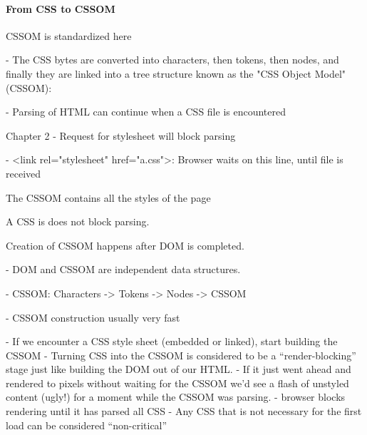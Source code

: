 \paragraph{From CSS to CSSOM}



CSSOM is standardized here %


- The CSS bytes are converted into characters, then tokens, then nodes, and finally they are linked into a tree structure known as the "CSS Object Model" (CSSOM):

- Parsing of HTML can continue when a CSS file is encountered


Chapter 2
- Request for stylesheet will block parsing 

- <link rel="stylesheet" href="a.css">: Browser waits on this line, until file is received

The CSSOM contains all the styles of the page

A CSS is does not block parsing. %

Creation of CSSOM happens after DOM is completed. %

- DOM and CSSOM are independent data structures.

- CSSOM: Characters -> Tokens -> Nodes -> CSSOM

- CSSOM construction usually very fast


- If we encounter a CSS style sheet (embedded or linked), start building the CSSOM
- Turning CSS into the CSSOM is considered to be a “render-blocking” stage just like building the DOM out of our HTML.
- If it just went ahead and rendered to pixels without waiting for the CSSOM we’d see a flash of unstyled content (ugly!) for a moment while the CSSOM was parsing.
- browser blocks rendering until it has parsed all CSS
- Any CSS that is not necessary for the first load can be considered “non-critical”


